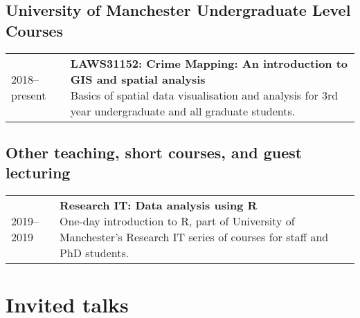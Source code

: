 \documentclass[10pt,a4paper,]{article}
\makeatletter
\def\briefitem#1#2#3{
#2 & \parbox[t]{0.85\textwidth}{%
      \textbf{#1}\\[-0.1cm]{\footnotesize #3}}\\[0.4cm]}
\def\briefsection#1{\begin{longtable}{@{\extracolsep{\fill}}ll}#1\end{longtable}}
\makeatother
\begin{document}
\hypertarget{university-of-manchester-undergraduate-level-courses}{%
\subsection{University of Manchester Undergraduate Level Courses}\label{university-of-manchester-undergraduate-level-courses}}

\briefsection{\briefitem{LAWS31152: Crime Mapping: An introduction to GIS and spatial analysis}{2018–present}{Basics of spatial data visualisation and analysis for 3rd year undergraduate and all graduate students.}\briefitem{LAWS20452 : Modelling Criminological Data}{2017–present}{Inferential statistics course for 2nd year undergraduates.}\briefitem{LAWS30620: Short Dissertation}{2017–present}{Lectures and supervision of students on secondary data analysis pathway for their final year dissertation.}\briefitem{LAWS20441: Making Sense of Criminological Data}{2016–present}{Introduction to quantitative research for 2nd year undergraduates.}}

\hypertarget{other-teaching-short-courses-and-guest-lecturing}{%
\subsection{Other teaching, short courses, and guest lecturing}\label{other-teaching-short-courses-and-guest-lecturing}}

\briefsection{\briefitem{Research IT: Data analysis using R}{2019–2019}{One-day introduction to R, part of University of Manchester's Research IT series of courses for staff and PhD students.}\briefitem{methods@manchester: Getting Started in R: introduction to data analysis \& visualisation}{2017–present}{Weeklong intensive course introducing students to using R and R Studio for data analysis. Open to all, usually attended by professionals and academics.}\briefitem{Q-Step internship preparation: Introduction to mapping data with QGIS}{2017–present}{Afternoon short introduction to mapping spatial data for Q-step internship students}\briefitem{Stockholm Royal Institute of Technology (KTH): Spatial Data Analysis in Practice}{2017–2017}{One-day introduction to mapping with QGIS and data collection from APIs as part of weeklong summer school for PhD students}\briefitem{University College London MSc Transport Studies: Trasport Safety and Security}{2012–2017}{Guest lecture for graduate module, UCL Department of Civil, Environmental, and Geomatic Engineering}}

\hypertarget{invited-talks}{%
\section{Invited talks}\label{invited-talks}}
\end{document}
